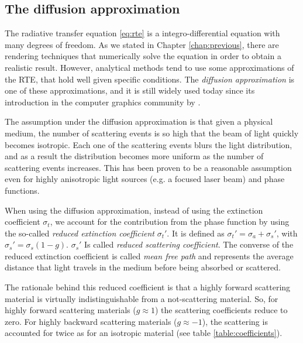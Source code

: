\subsection{The diffusion approximation}
The radiative transfer equation \ref{eq:rte} is a integro-differential equation with many degrees of freedom. As we stated in Chapter \ref{chap:previous}, there are rendering techniques that numerically solve the equation in order to obtain a realistic result. However, analytical methods tend to use some approximations of the RTE, that hold well given specific conditions. The \emph{diffusion approximation} \citep{books/daglib/0093591} is one of these approximations, and it is still widely used today since its introduction in the computer graphics community by \citep{raey}. 

The assumption under the diffusion approximation is that given a physical medium, the number of scattering events is so high that the beam of light quickly becomes isotropic. Each one of the scattering events blurs the light distribution, and as a result the distribution becomes more uniform as the number of scattering events increases. This has been proven to be a reasonable assumption even for highly anisotropic light sources (e.g. a focused laser beam) and phase functions.

When using the diffusion approximation, instead of using the extinction coefficient $\sigma_t$, we account for the contribution from the phase function by using the so-called \emph{reduced extinction coefficient} $\sigma_t'$. It is defined as $\sigma_t' = \sigma_a + \sigma_s'$, with $\sigma_s' = \sigma_s (1 - g)$. $\sigma_s'$ Is called \emph{reduced scattering coefficient}. The converse of the reduced extinction coefficient is called \emph{mean free path} and represents the average distance that light travels in the medium before being absorbed or scattered.

The rationale behind this reduced coefficient is that a highly forward scattering material is virtually indistinguishable from a not-scattering material. So, for highly forward scattering materials ($g \approx 1$) the scattering coefficients reduce to zero. For highly backward scattering materials ($g \approx -1$), the scattering is accounted for twice as for an isotropic material (see table \ref{table:coefficients}).

